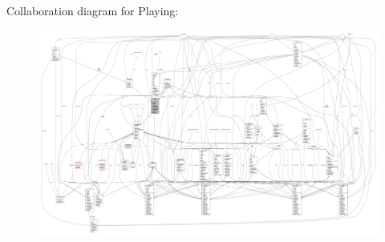 Collaboration diagram for Playing\+:
\nopagebreak
\begin{figure}[H]
\begin{center}
\leavevmode
\includegraphics[width=350pt]{classscenes_1_1_playing__coll__graph}
\end{center}
\end{figure}

